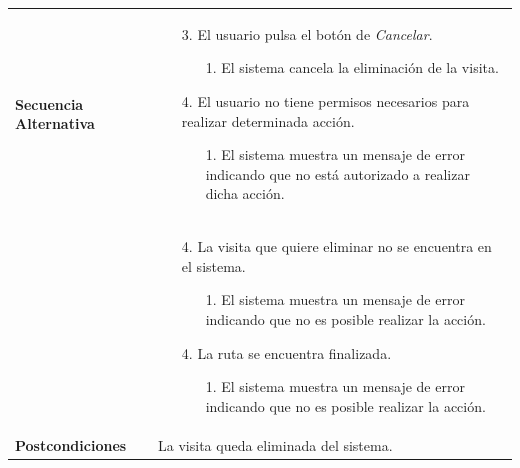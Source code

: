 \begin{longtable}{| p{4cm} | p{10cm} |}
\\
\hline
\textbf{Secuencia Alternativa} &\mbox{}\par\vspace{-\baselineskip}
\begin{enumerate}[leftmargin=0.7cm, topsep=0.1cm]
\item[3.] El usuario pulsa el botón de \textit{Cancelar}.
	\begin{itemize}
	\item[1.] El sistema cancela la eliminación de la visita.
	\end{itemize}
\item[4.] El usuario no tiene permisos necesarios para realizar determinada acción.
	\begin{itemize}
	\item[1.] El sistema muestra un mensaje de error indicando que no está autorizado a realizar dicha acción.
	\end{itemize}
\end{enumerate}
\\ &\mbox{}\par\vspace{-\baselineskip}	
\begin{enumerate}[leftmargin=0.7cm, topsep=0.1cm]
\item[4.] La visita que quiere eliminar no se encuentra en el sistema.
	\begin{itemize}
	\item[1.] El sistema muestra un mensaje de error indicando que no es posible realizar la acción.
	\end{itemize}
\item[4.] La ruta se encuentra finalizada.
	\begin{itemize}
	\item[1.] El sistema muestra un mensaje de error indicando que no es posible realizar la acción.
	\end{itemize}
\end{enumerate}
\\

\hline
\textbf{Postcondiciones} & 
La visita queda eliminada del sistema.\\
\hline
\end{longtable}



\newpage
